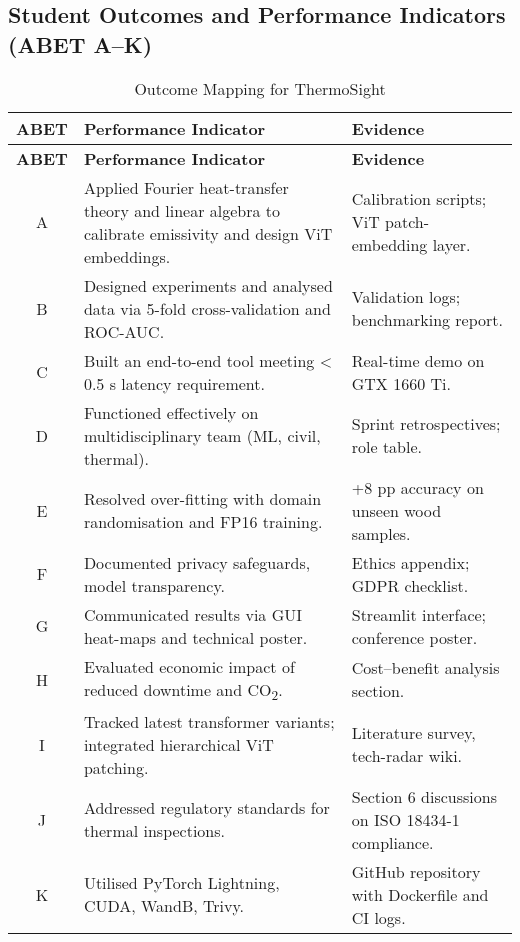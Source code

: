 \subsection{Student Outcomes and Performance Indicators (ABET A–K)}

\begin{longtable}{|c|p{5.5cm}|p{5.5cm}|}
\caption{Outcome Mapping for ThermoSight}\label{tab:abet}\\ \hline
\textbf{ABET} & \textbf{Performance Indicator} & \textbf{Evidence} \\ \hline
\endfirsthead
\hline
\textbf{ABET} & \textbf{Performance Indicator} & \textbf{Evidence} \\ \hline
\endhead
A & Applied Fourier heat-transfer theory and linear algebra to calibrate emissivity and design ViT embeddings. & Calibration scripts; ViT patch-embedding layer. \\ \hline
B & Designed experiments and analysed data via 5-fold cross-validation and ROC-AUC. & Validation logs; benchmarking report. \\ \hline
C & Built an end-to-end tool meeting <\,0.5 s latency requirement. & Real-time demo on GTX 1660 Ti. \\ \hline
D & Functioned effectively on multidisciplinary team (ML, civil, thermal). & Sprint retrospectives; role table. \\ \hline
E & Resolved over-fitting with domain randomisation and FP16 training. & +8 pp accuracy on unseen wood samples. \\ \hline
F & Documented privacy safeguards, model transparency. & Ethics appendix; GDPR checklist. \\ \hline
G & Communicated results via GUI heat-maps and technical poster. & Streamlit interface; conference poster. \\ \hline
H & Evaluated economic impact of reduced downtime and CO\textsubscript{2}. & Cost–benefit analysis section. \\ \hline
I & Tracked latest transformer variants; integrated hierarchical ViT patching. & Literature survey, tech-radar wiki. \\ \hline
J & Addressed regulatory standards for thermal inspections. & Section 6 discussions on ISO 18434-1 compliance. \\ \hline
K & Utilised PyTorch Lightning, CUDA, WandB, Trivy. & GitHub repository with Dockerfile and CI logs. \\ \hline
\end{longtable}


